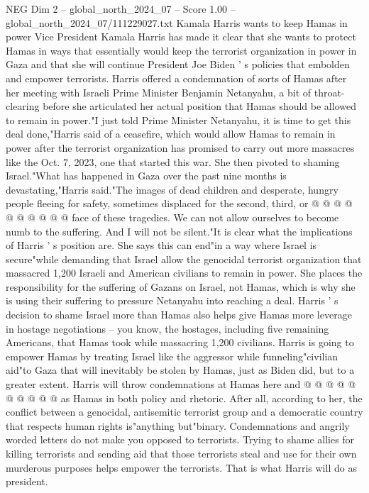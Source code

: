\begin{textsample}{NEG Dim 2 – global\_north\_2024\_07 – Score 1.00 – global\_north\_2024\_07/111229027.txt}  \label{ex:f2_neg_263}
Kamala Harris wants to keep Hamas in power Vice President Kamala Harris has made it clear that she wants to protect Hamas in ways that essentially would keep the terrorist organization in power in Gaza and that she will continue President Joe Biden ' s policies that embolden and empower terrorists.
Harris offered a condemnation of sorts of Hamas after her meeting with Israeli Prime Minister Benjamin Netanyahu, a bit of throat-clearing before she articulated her actual position that Hamas should be allowed to remain in power."I just told Prime Minister Netanyahu, it is time to get this deal done,"Harris said of a ceasefire, which would allow Hamas to remain in power after the terrorist organization has promised to carry out more massacres like the Oct. 7, 2023, one that started this war.
She then pivoted to shaming Israel."What has happened in Gaza over the past nine months is devastating,"Harris said."The images of dead children and desperate, hungry people fleeing for safety, sometimes displaced for the second, third, or @ @ @ @ @ @ @ @ @ @ face of these tragedies.
We can not allow ourselves to become numb to the suffering.
And I will not be silent."It is clear what the implications of Harris ' s position are.
She says this can end"in a way where Israel is secure"while demanding that Israel allow the genocidal terrorist organization that massacred 1,200 Israeli and American civilians to remain in power.
She places the responsibility for the suffering of Gazans on Israel, not Hamas, which is why she is using their suffering to pressure Netanyahu into reaching a deal.
Harris ' s decision to shame Israel more than Hamas also helps give Hamas more leverage in hostage negotiations -- you know, the hostages, including five remaining Americans, that Hamas took while massacring 1,200 civilians.
Harris is going to empower Hamas by treating Israel like the aggressor while funneling"civilian aid"to Gaza that will inevitably be stolen by Hamas, just as Biden did, but to a greater extent.
Harris will throw condemnations at Hamas here and @ @ @ @ @ @ @ @ @ @ as Hamas in both policy and rhetoric.
After all, according to her, the conflict between a genocidal, antisemitic terrorist group and a democratic country that respects human rights is"anything but"binary.
Condemnations and angrily worded letters do not make you opposed to terrorists.
Trying to shame allies for killing terrorists and sending aid that those terrorists steal and use for their own murderous purposes helps empower the terrorists.
That is what Harris will do as president.

\end{textsample}
